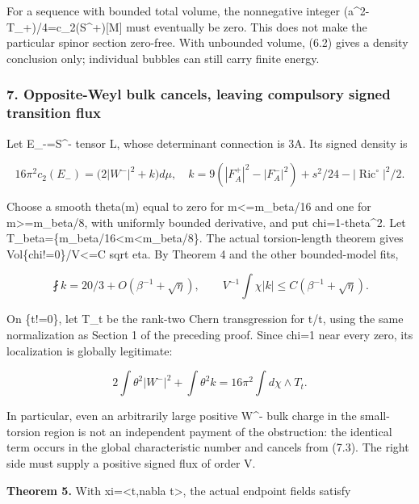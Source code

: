 \documentclass[
  10pt,
]{article}
\begin{document}
For a sequence with bounded total volume, the nonnegative integer
(a\^{}2-T\_+)/4=c\_2(S\^{}+){[}M{]} must eventually be zero. This does
not make the particular spinor section zero-free. With unbounded volume,
(6.2) gives a density conclusion only; individual bubbles can still
carry finite energy.

\hypertarget{opposite-weyl-bulk-cancels-leaving-compulsory-signed-transition-flux}{%
\subsubsection{7. Opposite-Weyl bulk cancels, leaving compulsory signed
transition
flux}\label{opposite-weyl-bulk-cancels-leaving-compulsory-signed-transition-flux}}

Let E\_-=S\^{}- tensor L, whose determinant connection is 3A. Its signed
density is

\[
 16\pi^2c_2(E_-)=\bigl(2|W^-|^2+k\bigr)d\mu,
\quad k=9(|F_A^+|^2-|F_A^-|^2)+s^2/24
                                      -|\operatorname{Ric}^{\circ}|^2/2.
                                                               \tag{7.1}
\]

Choose a smooth theta(m) equal to zero for m\textless=m\_beta/16 and one
for m\textgreater=m\_beta/8, with uniformly bounded derivative, and put
chi=1-theta\^{}2. Let
T\_beta=\{m\_beta/16\textless m\textless m\_beta/8\}. The actual
torsion-length theorem gives Vol\{chi!=0\}/V\textless=C sqrt eta. By
Theorem 4 and the other bounded-model fits,

\[
 \fint k=20/3+O(\beta^{-1}+\sqrt\eta),\qquad
 V^{-1}\int\chi|k|\le C(\beta^{-1}+\sqrt\eta).          \tag{7.2}
\]

On \{t!=0\}, let T\_t be the rank-two Chern transgression for
t/\textbar t\textbar, using the same normalization as Section 1 of the
preceding proof. Since chi=1 near every zero, its localization is
globally legitimate:

\[
 \boxed{2\int\theta^2|W^-|^2+\int\theta^2 k
                  =16\pi^2\int d\chi\wedge T_t.}       \tag{7.3}
\]

In particular, even an arbitrarily large positive W\^{}- bulk charge in
the small-torsion region is not an independent payment of the
obstruction: the identical term occurs in the global characteristic
number and cancels from (7.3). The right side must supply a positive
signed flux of order V.

\textbf{Theorem 5.} With xi=\textless t,nabla t\textgreater, the actual
endpoint fields satisfy
\end{document}
